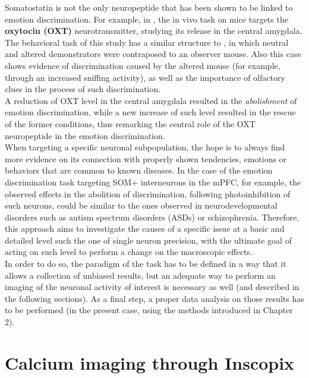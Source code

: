 \documentclass[12pt, a4paper]{report}
\begin{document}
Somatostatin is not the only neuropeptide that has been shown to be linked to emotion discrimination. For example, in \cite{10}, %
the in vivo task on mice targets the \textbf{oxytocin (OXT)} neurotransmitter, studying its release in the central amygdala. The behavioral task of this study has a similar structure to \cite{8}, in which neutral and altered demonstrators were contraposed to an observer mouse. Also this case shows evidence of  discrimination caused by the altered mouse (for example, through an increased sniffing activity), as well as the importance of olfactory clues in the process of such discrimination.\\
A reduction of  OXT level in the central amygdala resulted in the \textit{abolishment} of emotion discrimination, while a new increase of such level resulted in the rescue of the former conditions, thus remarking the central role of the OXT neuropeptide in the emotion discrimination.
\\

When targeting a specific neuronal subpopulation, the hope is to always find  more evidence on its connection with  properly shown tendencies, emotions or behaviors that are common to known diseases. In the case of the emotion discrimination task targeting SOM+ interneurons in the mPFC, for example, the observed effects in the abolition of discrimination, following photoinhibition of such neurons, could be similar to the ones observed in neurodevelopmental disorders such as autism spectrum disorders (ASDs) or schizophrenia. Therefore, this approach aims to investigate the causes of a specific issue at a basic and detailed level such the one of single neuron precision, with the ultimate goal of acting on such level to perform a change on the macroscopic effects.\\
In order to do so, the paradigm of the task has to be defined in a way that it allows a collection of unbiased results, but an adequate way to perform an imaging of the neuronal activity of interest is necessary as well (and described in the following sections). As a final step, a proper data analysis on those results has to be performed (in the present case, using the methods introduced in Chapter 2).


\section{Calcium imaging through Inscopix} \label{section 1.3}
\end{document}
